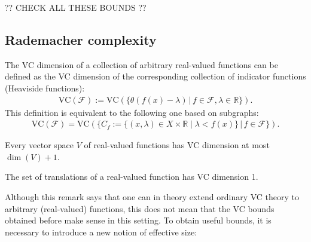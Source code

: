     ?? CHECK ALL THESE BOUNDS ??

\subsection{Rademacher complexity}

    \begin{remark}
        The VC dimension of a collection of arbitrary real-valued functions can be defined as the VC dimension of the corresponding collection of indicator functions (Heaviside functions):
        \begin{gather}
            \mathrm{VC}(\mathcal{F}) := \mathrm{VC}\left(\big\{\theta(f(x)-\lambda)\,\big\vert\,f\in\mathcal{F},\lambda\in\mathbb{R}\big\}\right).
        \end{gather}
        This definition is equivalent to the following one based on subgraphs:
        \begin{gather}
            \mathrm{VC}(\mathcal{F}) = \mathrm{VC}\left(\big\{C_f:=\{(x,\lambda)\in X\times\mathbb{R}\mid\lambda<f(x)\}\,\big\vert\,f\in\mathcal{F}\big\}\right).
        \end{gather}
    \end{remark}

    \begin{example}
        Every vector space $V$ of real-valued functions has VC dimension at most $\dim(V)+1$.
    \end{example}
    \begin{example}[Translations]
        The set of translations of a real-valued function has VC dimension 1.
    \end{example}

    Although this remark says that one can in theory extend ordinary VC theory to arbitrary (real-valued) functions, this does not mean that the VC bounds obtained before make sense in this setting. To obtain useful bounds, it is necessary to introduce a new notion of effective size:

